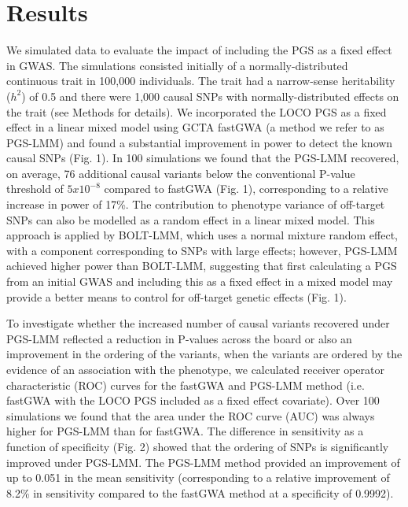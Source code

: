 \documentclass[doublespacing]{bmcart}
\begin{document}
\section*{Results}
We simulated data to evaluate the impact of including the PGS as a fixed effect in GWAS. The simulations consisted initially of a normally-distributed continuous trait in 100,000 individuals. The trait had a narrow-sense heritability ($h^2$) of 0.5 and there were 1,000 causal SNPs with normally-distributed effects on the trait (see Methods for details). We incorporated the LOCO PGS as a fixed effect in a linear mixed model using GCTA fastGWA \cite{jiang2019resource} (a method we refer to as PGS-LMM) and found a substantial improvement in power to detect the known causal SNPs (Fig. 1). In 100 simulations we found that the PGS-LMM recovered, on average, 76 additional causal variants below the conventional P-value threshold of $5x10^{-8}$ compared to fastGWA (Fig. 1), corresponding to a relative increase in power of 17\%. The contribution to phenotype variance of off-target SNPs can also be modelled as a random effect in a linear mixed model. This approach is applied by BOLT-LMM, which uses a normal mixture random effect, with a component corresponding to SNPs with large effects; however, PGS-LMM achieved higher power than BOLT-LMM, suggesting that first calculating a PGS from an initial GWAS and including this as a fixed effect in a mixed model may provide a better means to control for off-target genetic effects (Fig. 1).  \par 

To investigate whether the increased number of causal variants recovered under PGS-LMM reflected a reduction in P-values across the board or also an improvement in the ordering of the variants, when the variants are ordered by the evidence of an association with the phenotype, we calculated receiver operator characteristic (ROC) curves for the fastGWA and PGS-LMM method (i.e. fastGWA with the LOCO PGS included as a fixed effect covariate). Over 100 simulations we found that the area under the ROC curve (AUC) was always higher for PGS-LMM than for fastGWA. The difference in sensitivity as a function of specificity (Fig. 2) showed that the ordering of SNPs is significantly improved under PGS-LMM. The PGS-LMM method provided an improvement of up to 0.051 in the mean sensitivity (corresponding to a relative improvement of 8.2\% in sensitivity compared to the fastGWA method at a specificity of 0.9992).
\end{document}
